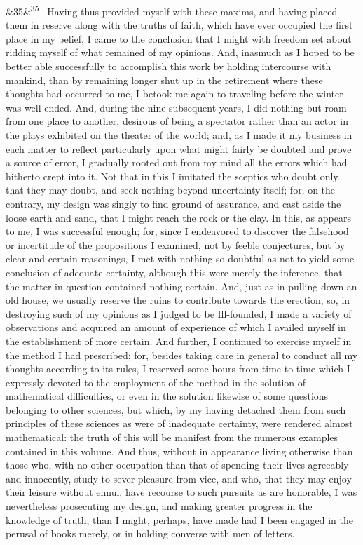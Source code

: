 \documentclass[12pt]{article}
\newcommand{\para}[1][]{\par\noindent\ifx&#1&\else\textsuperscript{\footnotesize #1}~\fi}
\begin{document}
\para[35] Having thus provided myself with these maxims, and having placed them in reserve along with the truths of faith, which have ever occupied the first place in my belief, I came to the conclusion that I might with freedom set about ridding myself of what remained of my opinions. And, inasmuch as I hoped to be better able successfully to accomplish this work by holding intercourse with mankind, than by remaining longer shut up in the retirement where these thoughts had occurred to me, I betook me again to traveling before the winter was well ended. And, during the nine subsequent years, I did nothing but roam from one place to another, desirous of being a spectator rather than an actor in the plays exhibited on the theater of the world; and, as I made it my business in each matter to reflect particularly upon what might fairly be doubted and prove a source of error, I gradually rooted out from my mind all the errors which had hitherto crept into it. Not that in this I imitated the sceptics who doubt only that they may doubt, and seek nothing beyond uncertainty itself; for, on the contrary, my design was singly to find ground of assurance, and cast aside the loose earth and sand, that I might reach the rock or the clay. In this, as appears to me, I was successful enough; for, since I endeavored to discover the falsehood or incertitude of the propositions I examined, not by feeble conjectures, but by clear and certain reasonings, I met with nothing so doubtful as not to yield some conclusion of adequate certainty, although this were merely the inference, that the matter in question contained nothing certain. And, just as in pulling down an old house, we usually reserve the ruins to contribute towards the erection, so, in destroying such of my opinions as I judged to be Ill-founded, I made a variety of observations and acquired an amount of experience of which I availed myself in the establishment of more certain. And further, I continued to exercise myself in the method I had prescribed; for, besides taking care in general to conduct all my thoughts according to its rules, I reserved some hours from time to time which I expressly devoted to the employment of the method in the solution of mathematical difficulties, or even in the solution likewise of some questions belonging to other sciences, but which, by my having detached them from such principles of these sciences as were of inadequate certainty, were rendered almost mathematical: the truth of this will be manifest from the numerous examples contained in this volume. And thus, without in appearance living otherwise than those who, with no other occupation than that of spending their lives agreeably and innocently, study to sever pleasure from vice, and who, that they may enjoy their leisure without ennui, have recourse to such pursuits as are honorable, I was nevertheless prosecuting my design, and making greater progress in the knowledge of truth, than I might, perhaps, have made had I been engaged in the perusal of books merely, or in holding converse with men of letters.
\end{document}
